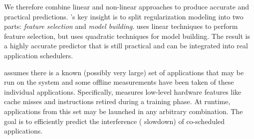 We therefore combine linear and non-linear approaches to produce
accurate and practical predictions.
\SYSTEMESP{}'s key insight is to split regularization modeling into two
parts: \emph{feature selection} and \emph{model building}.  \SYSTEMESP{}
uses linear techniques to perform feature selection, but uses
quadratic techniques for model building.  The result is a highly
accurate predictor that is still practical and can be integrated into
real application schedulers.

\SYSTEMESP{} assumes there is a known (possibly very large) set of
applications that may be run on the system and some offline
measurements have been taken of these individual applications.
Specifically, \SYSTEMESP{} measures low-level hardware features like
cache misses and instructions retired during a training phase.  At
runtime, applications from this set may be launched in any arbitrary
combination.  The goal is to efficiently predict the interference (\ie
slowdown) of co-scheduled applications.
